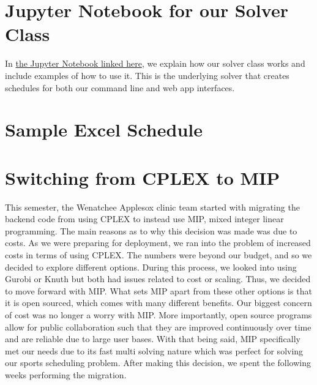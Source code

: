 \documentclass[book]{hmcclinic}
\begin{document}

\appendix

\chapter{Jupyter Notebook for our Solver Class}
In  \href{https://colab.research.google.com/drive/140xD88TPd37yqrozWjob-Eaao1BY9Jgf?usp=sharing}{the Jupyter Notebook linked here}, we explain how our solver class works and include examples of how to use it. This is the underlying solver that creates schedules for both our command line and web app interfaces.


\chapter{Sample Excel Schedule}


\chapter{Switching from CPLEX to MIP}
This semester, the Wenatchee Applesox clinic team started with migrating the backend code from using CPLEX to instead use MIP, mixed integer linear programming. The main reasons as to why this decision was made was due to costs. As we were preparing for deployment, we ran into the problem of increased costs in terms of using CPLEX. The numbers were beyond our budget, and so we decided to explore different options. During this process, we looked into using Gurobi or Knuth but both had issues related to cost or scaling. Thus, we decided to move forward with MIP. What sets MIP apart from these other options is that it is open sourced, which comes with many different benefits. Our biggest concern of cost was no longer a worry with MIP. More importantly, open source programs allow for public collaboration such that they are improved continuously over time and are reliable due to large user bases. With that being said, MIP specifically met our needs due to its fast multi solving nature which was perfect for solving our sports scheduling problem. After making this decision, we spent the following weeks performing the migration.
\end{document}
